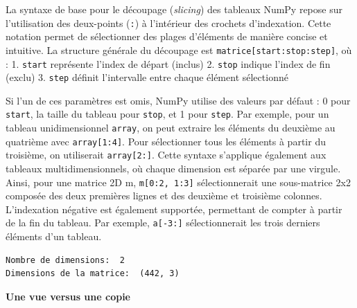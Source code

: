 La syntaxe de base pour le découpage (\emph{slicing}) des tableaux NumPy
repose sur l'utilisation des deux-points (\texttt{:}) à l'intérieur des
crochets d'indexation. Cette notation permet de sélectionner des plages
d'éléments de manière concise et intuitive. La structure générale du
découpage est \texttt{matrice{[}start:stop:step{]}}, où : 1.
\texttt{start} représente l'index de départ (inclus) 2. \texttt{stop}
indique l'index de fin (exclu) 3. \texttt{step} définit l'intervalle
entre chaque élément sélectionné

Si l'un de ces paramètres est omis, NumPy utilise des valeurs par défaut
: 0 pour \texttt{start}, la taille du tableau pour \texttt{stop}, et 1
pour \texttt{step}. Par exemple, pour un tableau unidimensionnel
\texttt{array}, on peut extraire les éléments du deuxième au quatrième
avec \texttt{array{[}1:4{]}}. Pour sélectionner tous les éléments à
partir du troisième, on utiliserait \texttt{array{[}2:{]}}. Cette
syntaxe s'applique également aux tableaux multidimensionnels, où chaque
dimension est séparée par une virgule. Ainsi, pour une matrice 2D m,
\texttt{m{[}0:2,\ 1:3{]}} sélectionnerait une sous-matrice 2x2 composée
des deux premières lignes et des deuxième et troisième colonnes.
L'indexation négative est également supportée, permettant de compter à
partir de la fin du tableau. Par exemple, \texttt{a{[}-3:{]}}
sélectionnerait les trois derniers éléments d'un tableau.

\label{495de5e4}
\label{cb10}
\begin{Shaded}
\begin{Highlighting}[]
\OperatorTok{=}\NormalTok{)}
\OperatorTok{=}\NormalTok{ img[:,}\NormalTok{,:]}
\NormalTok{(}
\NormalTok{(}
\end{Highlighting}
\end{Shaded}

\begin{verbatim}
Nombre de dimensions:  2
Dimensions de la matrice:  (442, 3)
\end{verbatim}

\textbf{Une vue versus une copie}

